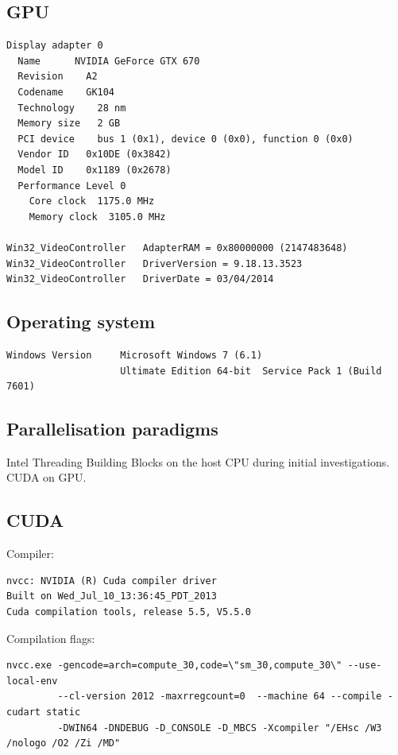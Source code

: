 \documentclass[11pt, oneside, a4paper]{article}
\begin{document}
\begin{appendices}
\subsection{GPU} %
\label{sub:gpu}
\begin{verbatim}
Display adapter 0 
  Name      NVIDIA GeForce GTX 670
  Revision    A2
  Codename    GK104
  Technology    28 nm
  Memory size   2 GB
  PCI device    bus 1 (0x1), device 0 (0x0), function 0 (0x0)
  Vendor ID   0x10DE (0x3842)
  Model ID    0x1189 (0x2678)
  Performance Level 0
    Core clock  1175.0 MHz
    Memory clock  3105.0 MHz

Win32_VideoController   AdapterRAM = 0x80000000 (2147483648)
Win32_VideoController   DriverVersion = 9.18.13.3523
Win32_VideoController   DriverDate = 03/04/2014
\end{verbatim}

\subsection{Operating system} %
\label{sub:operating_system}
\begin{verbatim}
Windows Version     Microsoft Windows 7 (6.1)
                    Ultimate Edition 64-bit  Service Pack 1 (Build 7601) 
\end{verbatim}

\subsection{Parallelisation paradigms} %
\label{sub:parallelisation_paradigms}
Intel Threading Building Blocks on the host CPU during initial investigations. CUDA on GPU.

\subsection{CUDA} %
\label{sub:cuda}
Compiler:
\begin{verbatim}
nvcc: NVIDIA (R) Cuda compiler driver
Built on Wed_Jul_10_13:36:45_PDT_2013
Cuda compilation tools, release 5.5, V5.5.0
\end{verbatim}
Compilation flags:
\begin{verbatim}
nvcc.exe -gencode=arch=compute_30,code=\"sm_30,compute_30\" --use-local-env 
         --cl-version 2012 -maxrregcount=0  --machine 64 --compile -cudart static 
         -DWIN64 -DNDEBUG -D_CONSOLE -D_MBCS -Xcompiler "/EHsc /W3 /nologo /O2 /Zi /MD"
\end{verbatim}



\end{appendices}
\end{document}
